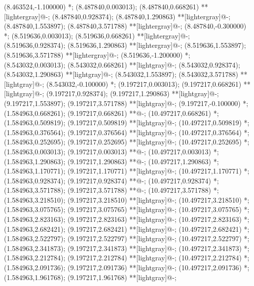 (8.463524,-1.100000) *{};
(8.487840,0.003013); (8.487840,0.668261) **[lightergray]@{-};
(8.487840,0.928374); (8.487840,1.290863) **[lightergray]@{-};
(8.487840,1.553897); (8.487840,3.571788) **[lightergray]@{-};
(8.487840,-0.300000) *{};
(8.519636,0.003013); (8.519636,0.668261) **[lightergray]@{-};
(8.519636,0.928374); (8.519636,1.290863) **[lightergray]@{-};
(8.519636,1.553897); (8.519636,3.571788) **[lightergray]@{-};
(8.519636,-1.200000) *{};
(8.543032,0.003013); (8.543032,0.668261) **[lightgray]@{-};
(8.543032,0.928374); (8.543032,1.290863) **[lightgray]@{-};
(8.543032,1.553897); (8.543032,3.571788) **[lightgray]@{-};
(8.543032,-0.100000) *{};
(9.197217,0.003013); (9.197217,0.668261) **[lightgray]@{-};
(9.197217,0.928374); (9.197217,1.290863) **[lightgray]@{-};
(9.197217,1.553897); (9.197217,3.571788) **[lightgray]@{-};
(9.197217,-0.100000) *{};
(1.584963,0.668261); (9.197217,0.668261) **@{-};
(10.497217,0.668261) *{};
(1.584963,0.509819); (9.197217,0.509819) **[lightgray]@{-};
(10.497217,0.509819) *{};
(1.584963,0.376564); (9.197217,0.376564) **[lightgray]@{-};
(10.497217,0.376564) *{};
(1.584963,0.252695); (9.197217,0.252695) **[lightgray]@{-};
(10.497217,0.252695) *{};
(1.584963,0.003013); (9.197217,0.003013) **@{-};
(10.497217,0.003013) *{};
(1.584963,1.290863); (9.197217,1.290863) **@{-};
(10.497217,1.290863) *{};
(1.584963,1.170771); (9.197217,1.170771) **[lightgray]@{-};
(10.497217,1.170771) *{};
(1.584963,0.928374); (9.197217,0.928374) **@{-};
(10.497217,0.928374) *{};
(1.584963,3.571788); (9.197217,3.571788) **@{-};
(10.497217,3.571788) *{};
(1.584963,3.218510); (9.197217,3.218510) **[lightgray]@{-};
(10.497217,3.218510) *{};
(1.584963,3.075765); (9.197217,3.075765) **[lightgray]@{-};
(10.497217,3.075765) *{};
(1.584963,2.823163); (9.197217,2.823163) **[lightgray]@{-};
(10.497217,2.823163) *{};
(1.584963,2.682421); (9.197217,2.682421) **[lightgray]@{-};
(10.497217,2.682421) *{};
(1.584963,2.522797); (9.197217,2.522797) **[lightgray]@{-};
(10.497217,2.522797) *{};
(1.584963,2.341873); (9.197217,2.341873) **[lightgray]@{-};
(10.497217,2.341873) *{};
(1.584963,2.212784); (9.197217,2.212784) **[lightgray]@{-};
(10.497217,2.212784) *{};
(1.584963,2.091736); (9.197217,2.091736) **[lightgray]@{-};
(10.497217,2.091736) *{};
(1.584963,1.961768); (9.197217,1.961768) **[lightgray]@{-};

